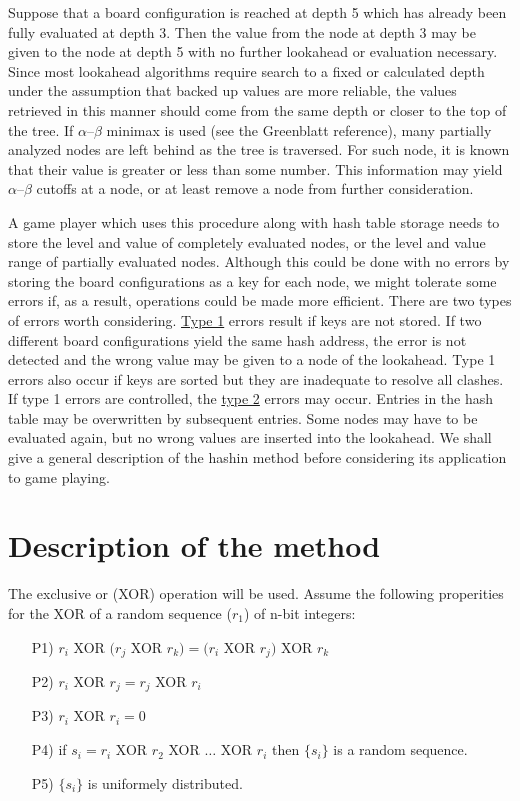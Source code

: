 \documentclass{article}
\begin{document}
Suppose that a board configuration is reached at depth 5 which has already been
fully evaluated at depth 3. Then the value from the node at depth 3 may be
given to the node at depth 5 with no further lookahead or evaluation
necessary. Since most lookahead algorithms require search to a fixed or
calculated depth under the assumption that backed up values are more reliable,
the values retrieved in this manner should come from the same depth or closer
to the top of the tree. If $\alpha$--$\beta$ minimax is used (see the Greenblatt
reference), many partially analyzed nodes are left behind as the tree is
traversed. For such node, it is known that their value is greater or less than
some number. This information may yield $\alpha$--$\beta$ cutoffs at a node, or at
least remove a node from further consideration.

A game player which uses this procedure along with hash table storage needs to
store the level and value of completely evaluated nodes, or the level and value
range of partially evaluated nodes. Although this could be done with no errors
by storing the board configurations as a key for each node, we might tolerate
some errors if, as a result, operations could be made more efficient. There are
two types of errors worth considering. \underline{Type 1} errors result if keys
are not stored. If two different board configurations yield the same hash
address, the error is not detected and the wrong value may be given to a node
of the lookahead. Type 1 errors also occur if keys are sorted but they are
inadequate to resolve all clashes. If type 1 errors are controlled, the
\underline{type 2} errors may occur. Entries in the hash table may be
overwritten by subsequent entries. Some nodes may have to be evaluated again,
but no wrong values are inserted into the lookahead. We shall give a general
description of the hashin method before considering its application to game
playing.

\section*{Description of the method}

The exclusive or (XOR) operation will be used. Assume the following properities for the XOR of a random sequence ($r_1$) of n-bit integers:

\begin{itemize}
\item[P1)] $r_i$ XOR $(r_j$ XOR $r_k) = (r_i$ XOR $r_j)$ XOR $r_k$
\item[P2)] $r_i$ XOR $r_j = r_j$ XOR $r_i$
\item[P3)] $r_i$ XOR $r_i = 0$
\item[P4)] if $s_i = r_i$ XOR $r_2$ XOR $\ldots$ XOR $r_i$ then $\{s_i\}$ is a random sequence.
\item[P5)] $\{s_i\}$ is uniformely distributed.
\end{itemize}
\end{document}
